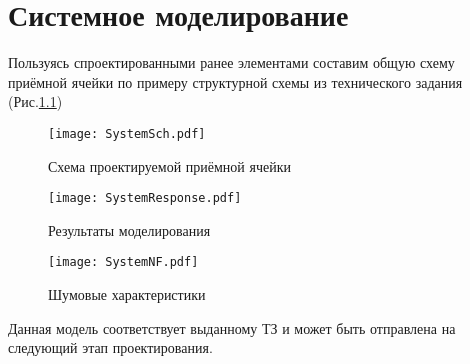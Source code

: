 \chapter{Системное моделирование}

Пользуясь спроектированными ранее элементами составим общую схему приёмной
ячейки по примеру структурной схемы из технического задания (Рис.\ref{fig:SystemSch})

\begin{figure}[H]
	\centering
	\texttt{[image: SystemSch.pdf]}
	\caption{Схема проектируемой приёмной ячейки}%
	\label{fig:SystemSch}
\end{figure}

\begin{figure}[H]
	\centering
	\texttt{[image: SystemResponse.pdf]}
	\caption{Результаты моделирования}%
	\label{fig:SystemResponse}
\end{figure}

\begin{figure}[H]
	\centering
	\texttt{[image: SystemNF.pdf]}
	\caption{Шумовые характеристики}%
	\label{fig:SystemNF}
\end{figure}

Данная модель соответствует выданному ТЗ и может быть отправлена на следующий 
этап проектирования.